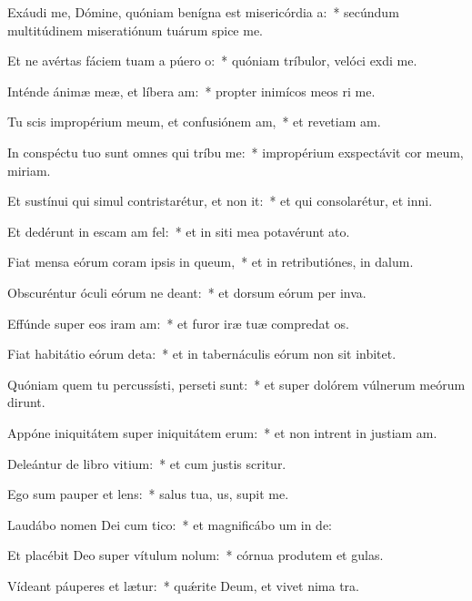 \item Exáudi me, Dómine, quóniam benígna est misericórdia a:~* secúndum multitúdinem miseratiónum tuárum spice  me.
\item Et ne avértas fáciem tuam a púero o:~* quóniam tríbulor, velóci exdi me.
\item Inténde ánimæ meæ, et líbera am:~* propter inimícos meos ri me.
\item Tu scis impropérium meum, et confusiónem am,~* et revetiam am.
\item In conspéctu tuo sunt omnes qui tríbu me:~* impropérium exspectávit cor meum,  miriam.
\item Et sustínui qui simul contristarétur, et non it:~* et qui consolarétur, et  inni.
\item Et dedérunt in escam am fel:~* et in siti mea potavérunt  ato.
\item Fiat mensa eórum coram ipsis in queum,~* et in retributiónes,  in dalum.
\item Obscuréntur óculi eórum ne deant:~* et dorsum eórum per inva.
\item Effúnde super eos iram am:~* et furor iræ tuæ compredat os.
\item Fiat habitátio eórum deta:~* et in tabernáculis eórum non sit  inbitet.
\item Quóniam quem tu percussísti, perseti sunt:~* et super dolórem vúlnerum meórum dirunt.
\item Appóne iniquitátem super iniquitátem erum:~* et non intrent in justiam am.
\item Deleántur de libro vitium:~* et cum justis  scritur.
\item Ego sum pauper et lens:~* salus tua, us, supit me.
\item Laudábo nomen Dei cum tico:~* et magnificábo um in de:
\item Et placébit Deo super vítulum nolum:~* córnua produtem et gulas.
\item Vídeant páuperes et lætur:~* quǽrite Deum, et vivet nima tra.
